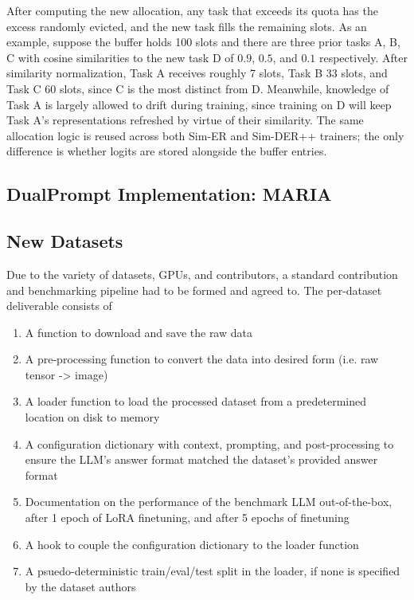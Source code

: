 \documentclass{article}
\begin{document}
After computing the new allocation, any task that exceeds its quota has the
excess randomly evicted, and the new task fills the remaining slots. As an
example, suppose the buffer holds 100 slots and there are three prior tasks
A, B, C with cosine similarities to the new task D of $0.9$, $0.5$, and $0.1$
respectively. After similarity normalization, Task A receives roughly 7
slots, Task B 33 slots, and Task C 60 slots, since C is the most distinct
from D. Meanwhile, knowledge of Task A is largely allowed to drift during
training, since training on D will keep Task A's representations refreshed
by virtue of their similarity. The same allocation logic is reused across
both Sim-ER and Sim-DER++ trainers; the only difference is whether logits are
stored alongside the buffer entries.

\subsection{DualPrompt Implementation: MARIA}

\subsection{New Datasets}
Due to the variety of datasets, GPUs, and contributors, a standard contribution and benchmarking pipeline had
to be formed and agreed to. The per-dataset deliverable consists of

\begin{enumerate}
		\item A function to download and save the raw data
		\item A pre-processing function to convert the data into desired form (i.e. raw tensor -> image)
		\item A loader function to load the processed dataset from a predetermined location on disk to memory
		\item A configuration dictionary with context, prompting, and post-processing to ensure the LLM's answer
				format matched the dataset's provided answer format
		\item Documentation on the performance of the benchmark LLM out-of-the-box, after 1 epoch of LoRA
				finetuning, and after 5 epochs of finetuning
		\item A hook to couple the configuration dictionary to the loader function
		\item A psuedo-deterministic train/eval/test split in the loader, if none is specified by the dataset authors
\end{enumerate}
\end{document}
